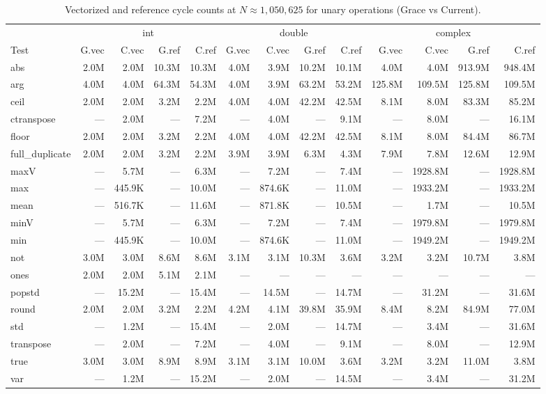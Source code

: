 \begin{table}[H]
\centering
\caption{Vectorized and reference cycle counts at $N \approx 1{,}050{,}625$ for unary operations (Grace vs Current).}
\label{tab:cycles-unary}
\tiny
\begin{tabular}{l | r r r r | r r r r | r r r r}
\toprule
 & \multicolumn{4}{c|}{int} & \multicolumn{4}{c|}{double} & \multicolumn{4}{c}{complex} \\
Test & G.vec & C.vec & G.ref & C.ref & G.vec & C.vec & G.ref & C.ref & G.vec & C.vec & G.ref & C.ref \\
\midrule
  abs & 2.0M & 2.0M & 10.3M & 10.3M & 4.0M & 3.9M & 10.2M & 10.1M & 4.0M & 4.0M & 913.9M & 948.4M \\
  arg & 4.0M & 4.0M & 64.3M & 54.3M & 4.0M & 3.9M & 63.2M & 53.2M & 125.8M & 109.5M & 125.8M & 109.5M \\
  ceil & 2.0M & 2.0M & 3.2M & 2.2M & 4.0M & 4.0M & 42.2M & 42.5M & 8.1M & 8.0M & 83.3M & 85.2M \\
  ctranspose & --- & 2.0M & --- & 7.2M & --- & 4.0M & --- & 9.1M & --- & 8.0M & --- & 16.1M \\
  floor & 2.0M & 2.0M & 3.2M & 2.2M & 4.0M & 4.0M & 42.2M & 42.5M & 8.1M & 8.0M & 84.4M & 86.7M \\
  full\_duplicate & 2.0M & 2.0M & 3.2M & 2.2M & 3.9M & 3.9M & 6.3M & 4.3M & 7.9M & 7.8M & 12.6M & 12.9M \\
  maxV & --- & 5.7M & --- & 6.3M & --- & 7.2M & --- & 7.4M & --- & 1928.8M & --- & 1928.8M \\
  max & --- & 445.9K & --- & 10.0M & --- & 874.6K & --- & 11.0M & --- & 1933.2M & --- & 1933.2M \\
  mean & --- & 516.7K & --- & 11.6M & --- & 871.8K & --- & 10.5M & --- & 1.7M & --- & 10.5M \\
  minV & --- & 5.7M & --- & 6.3M & --- & 7.2M & --- & 7.4M & --- & 1979.8M & --- & 1979.8M \\
  min & --- & 445.9K & --- & 10.0M & --- & 874.6K & --- & 11.0M & --- & 1949.2M & --- & 1949.2M \\
  not & 3.0M & 3.0M & 8.6M & 8.6M & 3.1M & 3.1M & 10.3M & 3.6M & 3.2M & 3.2M & 10.7M & 3.8M \\
  ones & 2.0M & 2.0M & 5.1M & 2.1M & --- & --- & --- & --- & --- & --- & --- & --- \\
  popstd & --- & 15.2M & --- & 15.4M & --- & 14.5M & --- & 14.7M & --- & 31.2M & --- & 31.6M \\
  round & 2.0M & 2.0M & 3.2M & 2.2M & 4.2M & 4.1M & 39.8M & 35.9M & 8.4M & 8.2M & 84.9M & 77.0M \\
  std & --- & 1.2M & --- & 15.4M & --- & 2.0M & --- & 14.7M & --- & 3.4M & --- & 31.6M \\
  transpose & --- & 2.0M & --- & 7.2M & --- & 4.0M & --- & 9.1M & --- & 8.0M & --- & 12.9M \\
  true & 3.0M & 3.0M & 8.9M & 8.9M & 3.1M & 3.1M & 10.0M & 3.6M & 3.2M & 3.2M & 11.0M & 3.8M \\
  var & --- & 1.2M & --- & 15.2M & --- & 2.0M & --- & 14.5M & --- & 3.4M & --- & 31.2M \\
\bottomrule
\end{tabular}
\end{table}
